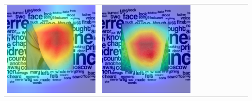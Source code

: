\begin{landscape}
\begin{table}[]
\begin{tabular}{@{}c c c c c c c c c c@{}}
			\includegraphics[width=.12\textheight ,keepaspectratio]{images/pretraining/gradcam/3/InceptionV3CombinedGradCam.png} &
			\includegraphics[width=.12\textheight ,keepaspectratio]{images/pretraining/gradcam/9/InceptionV3CombinedGradCam.png} &

\end{tabular}
\end{table}
\end{landscape}
